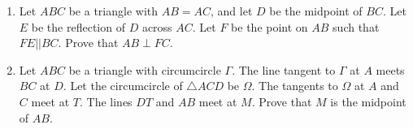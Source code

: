 \documentclass{extarticle}
\begin{document}
	\begin{enumerate}
		\item Let $ABC$ be a triangle with $AB=AC$, and let $D$ be the midpoint of $BC$. Let $E$ be the reflection of $D$ across $AC$. Let $F$ be the point on $AB$ such that $FE||BC$. Prove that $AB\perp FC$.

		\item Let $ABC$ be a triangle with circumcircle $\Gamma$. The line tangent to $\Gamma$ at $A$ meets $BC$ at $D$. Let the circumcircle of $\triangle ACD$ be $\Omega$. The tangents to $\Omega$ at $A$ and $C$ meet at $T$. The lines $DT$ and $AB$ meet at $M$. Prove that $M$ is the midpoint of $AB$.
	\end{enumerate}
	
\end{document}
